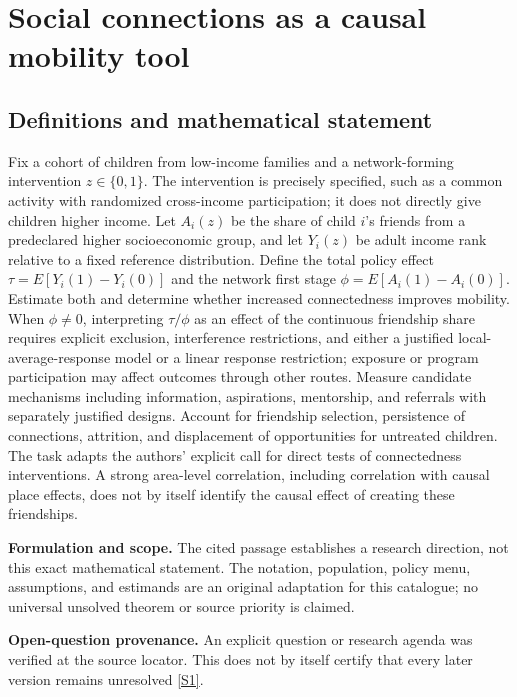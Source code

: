\documentclass[11pt]{article}
\newcommand{\sref}[2]{\hyperlink{source:#1:#2}{[S#2]}}
\begin{document}
\section*{Social connections as a causal mobility tool}\label{30007648}
\subsection{Definitions and mathematical statement}
Fix a cohort of children from low-income families and a network-forming intervention \(z\in\{0,1\}\). The intervention is precisely specified, such as a common activity with randomized cross-income participation; it does not directly give children higher income. Let \(A_i(z)\) be the share of child \(i\)'s friends from a predeclared higher socioeconomic group, and let \(Y_i(z)\) be adult income rank relative to a fixed reference distribution. Define the total policy effect \(\tau=E[Y_i(1)-Y_i(0)]\) and the network first stage \(\phi=E[A_i(1)-A_i(0)]\). Estimate both and determine whether increased connectedness improves mobility. When \(\phi\ne0\), interpreting \(\tau/\phi\) as an effect of the continuous friendship share requires explicit exclusion, interference restrictions, and either a justified local-average-response model or a linear response restriction; exposure or program participation may affect outcomes through other routes. Measure candidate mechanisms including information, aspirations, mentorship, and referrals with separately justified designs. Account for friendship selection, persistence of connections, attrition, and displacement of opportunities for untreated children. The task adapts the authors' explicit call for direct tests of connectedness interventions. A strong area-level correlation, including correlation with causal place effects, does not by itself identify the causal effect of creating these friendships.

\par\textbf{Formulation and scope.} The cited passage establishes a research direction, not this exact mathematical statement. The notation, population, policy menu, assumptions, and estimands are an original adaptation for this catalogue; no universal unsolved theorem or source priority is claimed.

\par\textbf{Open-question provenance.} An explicit question or research agenda was verified at the source locator. This does not by itself certify that every later version remains unresolved \sref{30007648}{1}.
\end{document}
